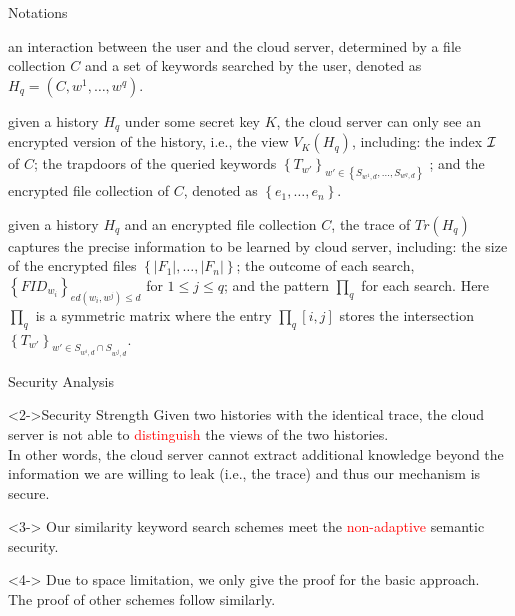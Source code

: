 \documentclass[handout]{beamer}
\begin{document}
\begin{frame}{Notations}
\begin{description}
	\item<2->[History] an interaction between the user and the cloud
	server, determined by a file collection $C$ and a set of keywords
	searched by the user, denoted as ${H_q} = (C,{w^1}, \ldots ,{w^q})$.
	\item<3->[View] given a history ${H_q}$ under some secret key $K$, the cloud
	server can only see an encrypted version of the history, i.e., the
	view ${V_K}({H_q})$, including: the index $\cal I$ of $C$; the trapdoors of the
	queried keywords ${\left\{ {{T_{w'}}} \right\}_{w' \in \left\{ {{S_{{w^1},d}}, \ldots ,{S_{{w^q},d}}} \right\}}}$ ; and the encrypted
	file collection of $C$, denoted as $\left\{ {{e_1}, \ldots ,{e_n}} \right\}$.
	\item<4->[Trace] given a history ${H_q}$ and an encrypted file collection $C$, the trace of ${Tr({H_q})}$ captures the precise information to be learned by cloud server, including: the size of the encrypted files $\left\{ {\left| {{F_1}} \right|, \ldots ,\left| {{F_n}} \right|} \right\}$; the outcome of each search, ${\left\{ {FI{D_{{w_i}}}} \right\}_{ed({w_i},{w^j}) \le d}}$ for $1 \le j \le q$; and the pattern ${\prod_q}$ for each search. Here ${\prod_q}$ is a symmetric matrix where the entry ${\prod _q}[i,j]$ stores the intersection ${\left\{ {{T_{w'}}} \right\}_{w' \in {S_{{w^i},d}} \cap {S_{{w^j},d}}}}$.
\end{description}
\end{frame}

\begin{frame}{Security Analysis}
	\begin{exampleblock}<2->{Security Strength}
		Given two histories with the identical trace, the cloud server is not able to \textcolor{red}{distinguish} the views of the two histories.\\
		In other words, the cloud server cannot extract additional knowledge beyond the information we are willing to leak (i.e., the trace) and thus our mechanism is secure.
	\end{exampleblock}
	\begin{theorem}<3->
		Our similarity keyword search schemes meet the \textcolor{red}{non-adaptive} semantic security.
	\end{theorem}
	\begin{exampleblock}<4->{}
		Due to space limitation, we only give the proof for the basic approach.\\
		The proof of other schemes follow similarly.
	\end{exampleblock}
	
\end{frame}
\end{document}
